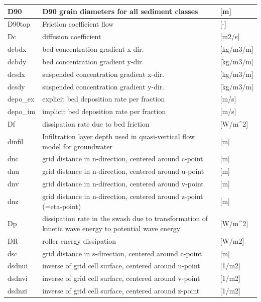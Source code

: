 \documentclass{article}
\begin{document}
\begin{tabular}{|p{0.7in}|p{2.5in}|p{0.9in}|}
D90 & D90 grain diameters for all sediment classes          & [m] \\ \hline 
D90top & Friction coefficient flow              & [-] \\ \hline 
Dc & diffusion coefficient               & [m2/s] \\ \hline 
dcbdx & bed concentration gradient x-dir.             & [kg/m3/m] \\ \hline 
dcbdy & bed concentration gradient y-dir.             & [kg/m3/m] \\ \hline 
dcsdx & suspended concentration gradient x-dir.             & [kg/m3/m] \\ \hline 
dcsdy & suspended concentration gradient y-dir.             & [kg/m3/m] \\ \hline 
depo\_ex & explicit bed deposition rate per fraction           & [m/s] \\ \hline 
depo\_im & implicit bed deposition rate per fraction           & [m/s] \\ \hline 
Df & dissipation rate due to bed friction           & [W/m\^{}2] \\ \hline 
dinfil & Infiltration layer depth used in quasi-vertical flow model for groundwater       & [m] \\ \hline 
dnc & grid distance in n-direction, centered around c-point          & [m] \\ \hline 
dnu & grid distance in n-direction, centered around u-point          & [m] \\ \hline 
dnv & grid distance in n-direction, centered around v-point          & [m] \\ \hline 
dnz & grid distance in n-direction, centered around z-point (=eta-point)         & [m] \\ \hline 
Dp & dissipation rate in the swash due to transformation of kinetic wave energy to potential wave energy & [W/m\^{}2] \\ \hline 
DR & roller energy dissipation              & [W/m2] \\ \hline 
dsc & grid distance in s-direction, centered around c-point          & [m] \\ \hline 
dsdnui & inverse of grid cell surface, centered around u-point         & [1/m2] \\ \hline 
dsdnvi & inverse of grid cell surface, centered around v-point         & [1/m2] \\ \hline 
dsdnzi & inverse of grid cell surface, centered around z-point         & [1/m2] \\ \hline 

\end{tabular}
\end{document}
